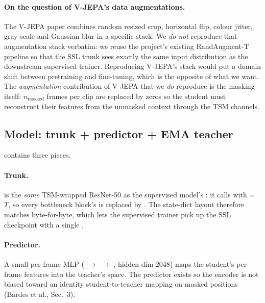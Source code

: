 \paragraph{On the question of V-JEPA's data augmentations.} The V-JEPA
paper combines random resized crop, horizontal flip, colour jitter,
gray-scale and Gaussian blur in a specific stack. We \emph{do not}
reproduce that augmentation stack verbatim: we reuse the project's
existing RandAugment-T pipeline so that the SSL trunk sees exactly the
same input distribution as the downstream supervised trainer.
Reproducing V-JEPA's stack would put a domain shift between pretraining
and fine-tuning, which is the opposite of what we want. The
\emph{augmentation} contribution of V-JEPA that we \emph{do} reproduce
is the masking itself: \(n_{\mathrm{masked}}\) frames per clip are
replaced by zeros so the student must reconstruct their features from
the unmasked context through the TSM channels.

\subsection{Model: trunk + predictor + EMA teacher}
\label{sec:phase3:model}

 contains three pieces.

\paragraph{Trunk.}  is the \emph{same}
TSM-wrapped ResNet-50 as the supervised model's : it
calls  with  =
\(T\), so every bottleneck block's  is replaced by
. The state-dict layout
therefore matches 
byte-for-byte, which lets the supervised trainer pick up the SSL
checkpoint with a single .

\paragraph{Predictor.} A small per-frame MLP
( $\to$  $\to$ , hidden dim 2048)
maps the student's per-frame features into the teacher's space. The
predictor exists so the encoder is not biased toward an identity
student-to-teacher mapping on masked positions (Bardes et al., Sec.~3).

